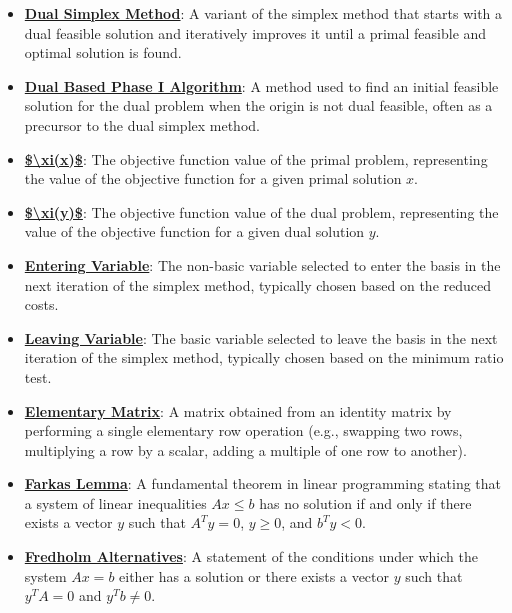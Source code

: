 \documentclass{article}%
\begin{document}
\begin{itemize}[leftmargin=*]%
\item \href{https://www.math.purdue.edu/~yipn/421/2024-10-03-DualSimplexMatrix.pdf#page=2}{\textbf{Dual Simplex Method}}: A variant of the simplex method that starts with a dual feasible solution and iteratively improves it until a primal feasible and optimal solution is found.%
\item \href{https://www.math.purdue.edu/~yipn/421/2024-10-03-DualSimplexMatrix.pdf#page=5}{\textbf{Dual Based Phase I Algorithm}}: A method used to find an initial feasible solution for the dual problem when the origin is not dual feasible, often as a precursor to the dual simplex method.%
\item \href{https://www.math.purdue.edu/~yipn/421/2024-10-03-DualSimplexMatrix.pdf#page=1}{\textbf{\$\textbackslash{}xi(x)\$}}: The objective function value of the primal problem, representing the value of the objective function for a given primal solution $x$.%
\item \href{https://www.math.purdue.edu/~yipn/421/2024-10-03-DualSimplexMatrix.pdf#page=1}{\textbf{\$\textbackslash{}xi(y)\$}}: The objective function value of the dual problem, representing the value of the objective function for a given dual solution $y$.%
\item \href{https://www.math.purdue.edu/~yipn/421/2024-10-03-DualSimplexMatrix.pdf#page=9}{\textbf{Entering Variable}}: The non-basic variable selected to enter the basis in the next iteration of the simplex method, typically chosen based on the reduced costs.%
\item \href{https://www.math.purdue.edu/~yipn/421/2024-10-03-DualSimplexMatrix.pdf#page=10}{\textbf{Leaving Variable}}: The basic variable selected to leave the basis in the next iteration of the simplex method, typically chosen based on the minimum ratio test.%
\item \href{https://www.math.purdue.edu/~yipn/421/2024-10-03-DualSimplexMatrix.pdf#page=15}{\textbf{Elementary Matrix}}: A matrix obtained from an identity matrix by performing a single elementary row operation (e.g., swapping two rows, multiplying a row by a scalar, adding a multiple of one row to another).%
\end{itemize}%
\begin{itemize}[leftmargin=*]%
\item \href{https://www.math.purdue.edu/~yipn/421/2024-10-28-Farkas.pdf#page=1}{\textbf{Farkas Lemma}}: A fundamental theorem in linear programming stating that a system of linear inequalities $Ax \le b$ has no solution if and only if there exists a vector $y$ such that $A^T y = 0$, $y \ge 0$, and $b^T y < 0$.%
\item \href{https://www.math.purdue.edu/~yipn/421/2024-10-28-Farkas.pdf#page=3}{\textbf{Fredholm Alternatives}}: A statement of the conditions under which the system $Ax = b$ either has a solution or there exists a vector $y$ such that $y^T A = 0$ and $y^T b \neq 0$.%
\end{itemize}%
\end{document}
